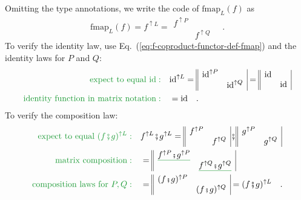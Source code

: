 Omitting the type annotations, we write the code of $\text{fmap}_{L}(f)$
as
\begin{equation}
\text{fmap}_{L}(f)=f^{\uparrow L}=\begin{array}{||cc|}
f^{\uparrow P} & \\
 & f^{\uparrow Q}
\end{array}\quad.\label{eq:f-coproduct-functor-def-fmap}
\end{equation}
To verify the identity law, use Eq.~(\ref{eq:f-coproduct-functor-def-fmap})
and the identity laws for $P$ and $Q$:
\begin{align*}
{\color{greenunder}\text{expect to equal }\text{id}:}\quad & \text{id}^{\uparrow L}=\begin{array}{||cc|}
\text{id}^{\uparrow P} & \\
 & \text{id}^{\uparrow Q}
\end{array}=\begin{array}{||cc|}
\text{id} & \\
 & \text{id}
\end{array}\\
{\color{greenunder}\text{identity function in matrix notation}:}\quad & =\text{id}\quad.
\end{align*}
To verify the composition law:
\begin{align*}
{\color{greenunder}\text{expect to equal }(f\bef g)^{\uparrow L}:}\quad & f^{\uparrow L}\bef g^{\uparrow L}=\begin{array}{||cc|}
f^{\uparrow P} & \\
 & f^{\uparrow Q}
\end{array}\bef\begin{array}{||cc|}
g^{\uparrow P} & \\
 & g^{\uparrow Q}
\end{array}\\
{\color{greenunder}\text{matrix composition}:}\quad & =\begin{array}{||cc|}
\gunderline{f^{\uparrow P}\bef g^{\uparrow P}} & \\
 & \gunderline{f^{\uparrow Q}\bef g^{\uparrow Q}}
\end{array}\\
{\color{greenunder}\text{composition laws for }P,Q:}\quad & =\begin{array}{||cc|}
(f\bef g)^{\uparrow P} & \\
 & (f\bef g)^{\uparrow Q}
\end{array}=(f\bef g)^{\uparrow L}\quad.
\end{align*}


